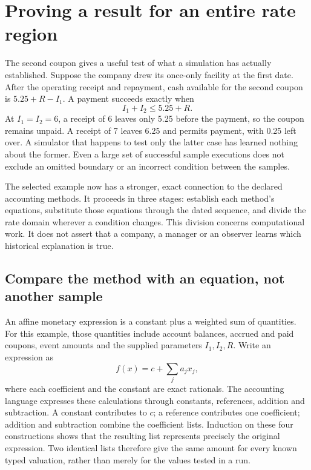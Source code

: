 \section{Proving a result for an entire rate region}
\label{sim:certified-rate-regions}

The second coupon gives a useful test of what a simulation has actually established. Suppose the company drew its once-only facility at the first date. After the operating receipt and repayment, cash available for the second coupon is $5.25+R-I_1$. A payment succeeds exactly when
\begin{equation}
 I_1+I_2\leq 5.25+R.
 \label{eq:certified-second-payment}
\end{equation}
At $I_1=I_2=6$, a receipt of 6 leaves only 5.25 before the payment, so the coupon remains unpaid. A receipt of 7 leaves 6.25 and permits payment, with 0.25 left over. A simulator that happens to test only the latter case has learned nothing about the former. Even a large set of successful sample executions does not exclude an omitted boundary or an incorrect condition between the samples.

The selected example now has a stronger, exact connection to the declared accounting methods. It proceeds in three stages: establish each method's equations, substitute those equations through the dated sequence, and divide the rate domain wherever a condition changes. This division concerns computational work. It does not assert that a company, a manager or an observer learns which historical explanation is true.

\subsection{Compare the method with an equation, not another sample}

An affine monetary expression is a constant plus a weighted sum of quantities. For this example, those quantities include account balances, accrued and paid coupons, event amounts and the supplied parameters $I_1,I_2,R$. Write an expression as
\begin{equation}
 f(x)=c+\sum_j a_jx_j,
 \label{eq:certified-affine-form}
\end{equation}
where each coefficient and the constant are exact rationals. The accounting language expresses these calculations through constants, references, addition and subtraction. A constant contributes to $c$; a reference contributes one coefficient; addition and subtraction combine the coefficient lists. Induction on these four constructions shows that the resulting list represents precisely the original expression. Two identical lists therefore give the same amount for every known typed valuation, rather than merely for the values tested in a run.

